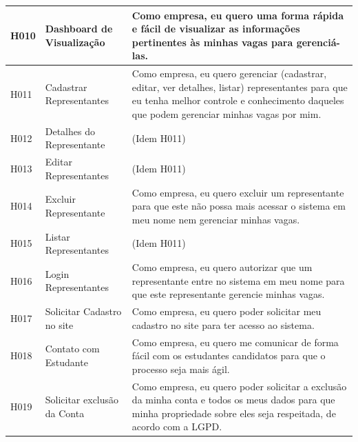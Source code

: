 \begin{quadro}[H]
\begin{tabular}{|l|l|p{9cm}|}
	\hline
	H010 & Dashboard de Visualização & Como empresa, eu quero uma forma rápida e fácil de visualizar as informações pertinentes às minhas vagas para gerenciá-las. \\
	\hline
	H011 & Cadastrar Representantes & Como empresa, eu quero gerenciar (cadastrar, editar, ver detalhes, listar) representantes para que eu tenha melhor controle e conhecimento daqueles que podem gerenciar minhas vagas por mim. \\
	\hline
	H012 & Detalhes do Representante & (Idem H011) \\
	\hline
	H013 & Editar Representantes & (Idem H011) \\
	\hline
	H014 & Excluir Representante & Como empresa, eu quero excluir um representante para que este não possa mais acessar o sistema em meu nome nem gerenciar minhas vagas. \\
	\hline
	H015 & Listar Representantes & (Idem H011) \\
	\hline
	H016 & Login Representantes & Como empresa, eu quero autorizar que um representante entre no sistema em meu nome para que este representante gerencie minhas vagas. \\
	\hline
	H017 & Solicitar Cadastro no site & Como empresa, eu quero poder solicitar meu cadastro no site para ter acesso ao sistema.\\
	\hline
	H018 & Contato com Estudante & Como empresa, eu quero me comunicar de forma fácil com os estudantes candidatos para que o processo seja mais ágil. \\
	\hline
	H019 & Solicitar exclusão da Conta & Como empresa, eu quero poder solicitar a exclusão da minha conta e todos os meus dados para que minha propriedade sobre eles seja respeitada, de acordo com a LGPD. \\
	\hline
	
	\end{tabular}
\end{quadro}

